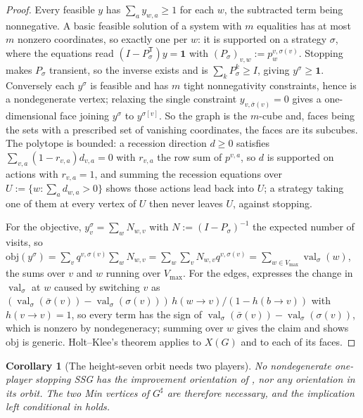 \documentclass[11pt]{article}
\theoremstyle{plain}
\newtheorem{corollary}[theorem]{Corollary}
\theoremstyle{definition}
\DeclareMathOperator{\val}{val}
\newcommand{\Vmax}{V_{\max}}
\newcommand{\bbone}{\mathbf{1}}
\begin{document}
\begin{proof}
Every feasible $y$ has $\sum_a y_{w,a}\ge1$ for each $w$, the subtracted term
being nonnegative. A basic feasible solution of a system with $m$ equalities
has at most $m$ nonzero coordinates, so exactly one per $w$: it is supported
on a strategy $\sigma$, where the equations read
$(I-P_\sigma^{\mathsf T})y=\bbone$ with $(P_\sigma)_{v,w}:=p^{v,\sigma(v)}_w$.
Stopping makes $P_\sigma$ transient, so the inverse exists and is
$\sum_k P_\sigma^{k}\ge I$, giving $y^{\sigma}\ge\bbone$. Conversely each
$y^{\sigma}$ is feasible and has $m$ tight nonnegativity constraints, hence
is a nondegenerate vertex; relaxing the single constraint
$y_{v,\bar\sigma(v)}=0$ gives a one-dimensional face joining $y^{\sigma}$ to
$y^{\sigma[v]}$. So the graph is the $m$-cube and, faces being the sets with a
prescribed set of vanishing coordinates, the faces are its subcubes. The
polytope is bounded: a recession direction $d\ge0$ satisfies
$\sum_{v,a}(1-r_{v,a})d_{v,a}=0$ with $r_{v,a}$ the row sum of $p^{v,a}$,
so $d$ is supported on actions with $r_{v,a}=1$, and summing the recession
equations over $U:=\{w:\sum_ad_{w,a}>0\}$ shows those actions lead back
into $U$; a strategy taking one of them at every vertex of $U$ then never
leaves $U$, against stopping.

For the objective, $y^{\sigma}_{v}=\sum_w N_{w,v}$ with
$N:=(I-P_\sigma)^{-1}$ the expected number of visits, so
$\mathrm{obj}(y^{\sigma})=\sum_v q^{v,\sigma(v)}\sum_wN_{w,v}
=\sum_w\sum_vN_{w,v}q^{v,\sigma(v)}=\sum_{w\in\Vmax}\val_\sigma(w)$, the
sums over $v$ and $w$ running over $\Vmax$.
For the edges,  expresses the change in $\val_\sigma$ at
$w$ caused by switching $v$ as
$(\val_\sigma(\bar\sigma(v))-\val_\sigma(\sigma(v)))\,h(w\!\to\!v)/(1-h(b\!\to\!v))$
with $h(v\!\to\!v)=1$, so every term has the sign of
$\val_\sigma(\bar\sigma(v))-\val_\sigma(\sigma(v))$, which is nonzero by
nondegeneracy; summing over $w$ gives the claim and shows $\mathrm{obj}$ is
generic. Holt--Klee's theorem applies to $X(G)$ and to each of its faces.
\end{proof}

\begin{corollary}[The height-seven orbit needs two players]\label{cor:seven-two-player}
No nondegenerate one-player stopping SSG has the improvement orientation of
, nor any orientation in its orbit. The two Min
vertices of $G^{\sharp}$ are therefore necessary, and the implication left
conditional in  holds.
\end{corollary}
\end{document}
